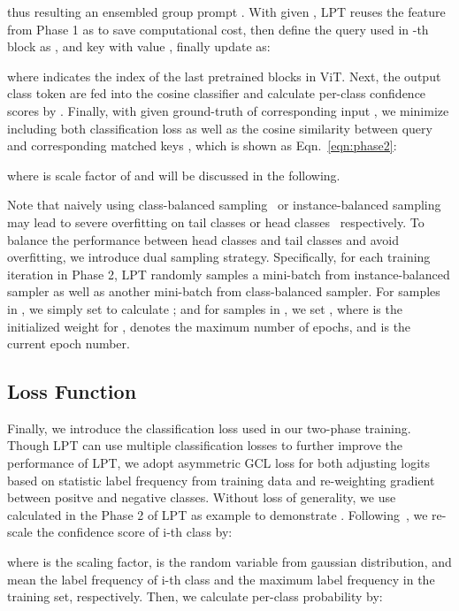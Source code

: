 \documentclass{article} \usepackage{iclr2023_conference,times}
\begin{document}
thus resulting an ensembled group prompt . 
With given , LPT reuses the feature  from Phase 1 as  to save computational cost, then define the query used in -th block as , and key with value ,
finally update  as:

where  indicates the index of the last  pretrained blocks in ViT.
Next, the output class token  are fed into the cosine classifier  and calculate per-class confidence scores by . 
Finally, with given ground-truth  of corresponding input , we minimize  including both classification loss  as well as the cosine similarity between query  and corresponding matched keys , which is shown as Eqn.~\ref{eqn:phase2}:

where  is scale factor of  and will be discussed in the following. 

Note that naively using class-balanced sampling~\citep{Kang2020Decoupling} or instance-balanced sampling~\citep{Kang2020Decoupling} may lead to severe overfitting on tail classes or head classes~\citep{zhang2021deep} respectively.
To balance the performance between head classes and tail classes and avoid overfitting, we introduce dual sampling strategy. 
Specifically, for each training iteration in Phase 2, LPT randomly samples a mini-batch  from instance-balanced sampler as well as another mini-batch  from class-balanced sampler. For samples in , we simply set  to calculate ; and for samples in , we set , where  is the initialized weight for ,  denotes the maximum number of epochs, and  is the current epoch number.  

\vspace{-0.5em}
\subsection{Loss Function}\label{sec:method_loss}
\vspace{-0.4em}
Finally, we introduce the classification loss   used in our two-phase training. Though LPT  can use multiple classification losses to further improve the performance of LPT, we adopt asymmetric GCL loss  for both adjusting logits based on statistic label frequency from training data and re-weighting gradient between positve and negative classes. 
Without loss of generality, we use  calculated in the Phase 2 of LPT as example to demonstrate . Following~\citep{Li2022Long}, we re-scale the confidence score of i-th class by:

where  is the scaling factor,  is the random variable from gaussian distribution,  and  mean the label frequency of i-th class and the maximum label frequency in the training set, respectively. 
Then, we calculate per-class probability  by:
\end{document}
